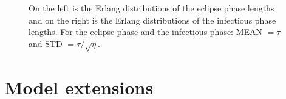 \begin{figure}
\centering
\caption{On the left is the Erlang distributions of the eclipse phase lengths and on the right is the Erlang distributions of the infectious phase lengths. For the eclipse phase and the infectious phase: MEAN $= \tau$ and STD $= \tau/\sqrt{\eta}$. \label{fig_tauEdis}}
\end{figure}



\section{Model extensions}

